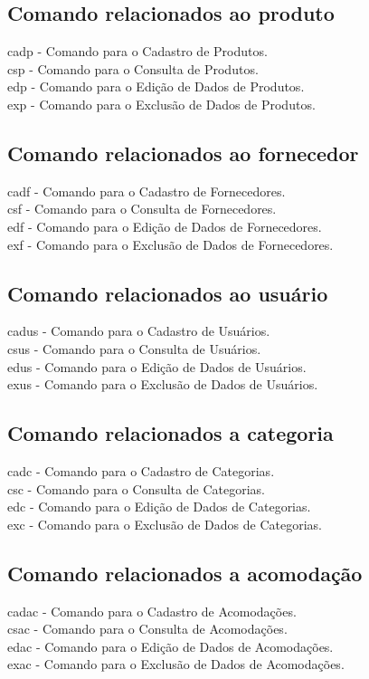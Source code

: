 \documentclass{article}
\begin{document}
	\subsection{Comando relacionados ao produto}
	\textbullet cadp - Comando para o Cadastro de Produtos.\\
	\textbullet csp - Comando para o Consulta de Produtos.\\
	\textbullet edp - Comando para o Edição de Dados de Produtos.\\
	\textbullet exp - Comando para o Exclusão de Dados de Produtos.\\
	\subsection{Comando relacionados ao fornecedor}
	\textbullet cadf - Comando para o Cadastro de Fornecedores.\\
	\textbullet csf - Comando para o Consulta de Fornecedores.\\
	\textbullet edf - Comando para o Edição de Dados de Fornecedores.\\
	\textbullet exf - Comando para o Exclusão de Dados de Fornecedores.\\
	\subsection{Comando relacionados ao usuário}
	\textbullet cadus - Comando para o Cadastro de Usuários.\\
	\textbullet csus - Comando para o Consulta de Usuários.\\
	\textbullet edus - Comando para o Edição de Dados de Usuários.\\
	\textbullet exus - Comando para o Exclusão de Dados de Usuários.\\
	\subsection{Comando relacionados a categoria}
	\textbullet cadc - Comando para o Cadastro de Categorias.\\
	\textbullet csc - Comando para o Consulta de Categorias.\\
	\textbullet edc - Comando para o Edição de Dados de Categorias.\\
	\textbullet exc - Comando para o Exclusão de Dados de Categorias.\\
	\subsection{Comando relacionados a acomodação}
	\textbullet cadac - Comando para o Cadastro de Acomodações.\\
	\textbullet csac - Comando para o Consulta de Acomodações.\\
	\textbullet edac - Comando para o Edição de Dados de Acomodações.\\
	\textbullet exac - Comando para o Exclusão de Dados de Acomodações.\\
\end{document}
